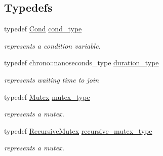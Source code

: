 \subsection*{Typedefs}
\begin{DoxyCompactItemize}
\item 
\hypertarget{namespacehryky_1_1exclusion_ad55c6711217e878a379eed07ea146e3c}{typedef \hyperlink{classhryky_1_1exclusion_1_1_cond}{Cond} \hyperlink{namespacehryky_1_1exclusion_ad55c6711217e878a379eed07ea146e3c}{cond\-\_\-type}}\label{namespacehryky_1_1exclusion_ad55c6711217e878a379eed07ea146e3c}

\begin{DoxyCompactList}\small\item\em represents a condition variable. \end{DoxyCompactList}\item 
\hypertarget{namespacehryky_1_1exclusion_ad196e82d77cdc66488c1ad69363688b8}{typedef chrono\-::nanoseconds\-\_\-type \hyperlink{namespacehryky_1_1exclusion_ad196e82d77cdc66488c1ad69363688b8}{duration\-\_\-type}}\label{namespacehryky_1_1exclusion_ad196e82d77cdc66488c1ad69363688b8}

\begin{DoxyCompactList}\small\item\em represents waiting time to join \end{DoxyCompactList}\item 
\hypertarget{namespacehryky_1_1exclusion_af3f8d05b34064ca5b0e15ed01d1546c2}{typedef \hyperlink{classhryky_1_1exclusion_1_1_mutex}{Mutex} \hyperlink{namespacehryky_1_1exclusion_af3f8d05b34064ca5b0e15ed01d1546c2}{mutex\-\_\-type}}\label{namespacehryky_1_1exclusion_af3f8d05b34064ca5b0e15ed01d1546c2}

\begin{DoxyCompactList}\small\item\em represents a mutex. \end{DoxyCompactList}\item 
\hypertarget{namespacehryky_1_1exclusion_a1562883d89e93695e533a4de08782445}{typedef \hyperlink{classhryky_1_1exclusion_1_1_recursive_mutex}{Recursive\-Mutex} \hyperlink{namespacehryky_1_1exclusion_a1562883d89e93695e533a4de08782445}{recursive\-\_\-mutex\-\_\-type}}\label{namespacehryky_1_1exclusion_a1562883d89e93695e533a4de08782445}

\begin{DoxyCompactList}\small\item\em represents a mutex. \end{DoxyCompactList}\end{DoxyCompactItemize}
